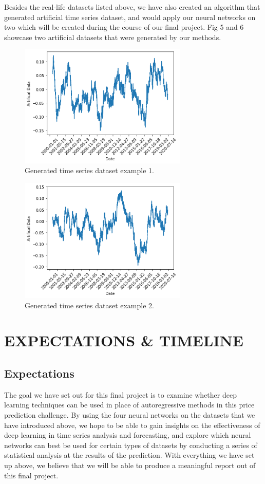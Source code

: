\documentclass[letterpaper, 10 pt, conference]{ieeeconf}  %
\begin{document}
    Besides the real-life datasets listed above, we have also created an algorithm that generated artificial time series dataset, and would apply our neural networks on two which will be created during the course of our final project. Fig 5 and 6 showcase two artificial datasets that were generated by our methods.
    \begin{figure}[thpb]
        \centering
        \includegraphics[width=8cm]{5.png}
        \caption{Generated time series dataset example 1.}
        \label{figurelabel}
     \end{figure}
     \begin{figure}[thpb]
        \centering
        \includegraphics[width=8cm]{6.png}
        \caption{Generated time series dataset example 2.}
        \label{figurelabel}
     \end{figure}
\section{EXPECTATIONS \& TIMELINE}

    \subsection{Expectations}
    The goal we have set out for this final project is to examine whether deep learning techniques can be used in place of autoregressive methods in this price prediction challenge. By using the four neural networks on the datasets that we have introduced above, we hope to be able to gain insights on the effectiveness of deep learning in time series analysis and forecasting, and explore which neural networks can best be used for certain types of datasets by conducting a series of statistical analysis at the results of the prediction. With everything we have set up above, we believe that we will be able to produce a meaningful report out of this final project.
\end{document}
